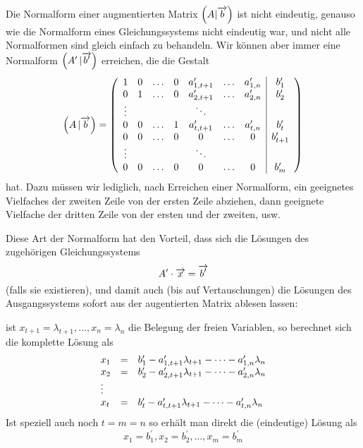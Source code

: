 \begin{notiz}\label{gls_einfache_normalform} 
Die Normalform einer augmentierten Matrix $\left(A \vert \overrightarrow{b}\right)$ ist nicht eindeutig, genauso wie die 
Normalform eines Gleichungssystems nicht eindeutig war, und nicht alle Normalformen sind gleich einfach zu 
behandeln. Wir können aber immer eine Normalform $\left(A' \, \vert \overrightarrow{b'}\right)$ erreichen, die 
die Gestalt 
  	$$ \left(A \, \vert \overrightarrow{b}\right) = \left( \begin{array} {c c c c c c c | c}
   	1 & 0 & \ldots & 0 & a^{\prime}_{1,t+1} & \ldots & a^{\prime}_{1,n} & b_1^{\prime} \\
   	0 & 1 & \ldots & 0 & a^{\prime}_{2,t+1} & \ldots & a^{\prime}_{2,n} & b_2^{\prime} \\
   	\vdots & & & & \ddots & & & \\
   	0 & 0 & \ldots & 1 & a^{\prime}_{t, t+1} & \ldots & a^{\prime}_{t, n} & b_t^{\prime} \\
   	0 & 0 & \ldots & 0 & 0 & \ldots & 0 & b_{t+1}^{\prime} \\
   	\vdots & & & & \ddots & & & \\
   	0 & 0 & \ldots & 0 & 0 & \ldots & 0 & b_m^{\prime} \\ \end{array} \right) $$
hat. Dazu müssen wir lediglich, nach Erreichen einer Normalform, ein geeignetes Vielfaches der zweiten Zeile 
von der ersten Zeile abziehen, dann geeignete Vielfache der dritten Zeile von der ersten und der zweiten, usw.

Diese Art der Normalform hat den Vorteil, dass sich die Lösungen des zugehörigen Gleichungssystems
  	$$ A^{\prime} \cdot \overrightarrow{x} = \overrightarrow{b^{\prime}} $$
(falls sie existieren), und damit auch (bis auf Vertauschungen) die Lösungen des Ausgangssystems sofort 
aus der augentierten Matrix ablesen lassen:

ist $x_{t+1} = \lambda_{t+1}, \ldots, x_n = \lambda_n$ die Belegung der freien Variablen, so berechnet sich 
die komplette Lösung als
  	$$ \begin{array} {l c l}
   	x_1 & = & b^{\prime}_1 - a^{\prime}_{1,t+1} \lambda_{t+1} - \cdots - a^{\prime}_{1,n} \lambda_n \\
   	x_2 & = & b^{\prime}_2 - a^{\prime}_{2,t+1} \lambda_{t+1} - \cdots - a^{\prime}_{2,n} \lambda_n \\
   	\vdots & & \\
   	x_t & = & b^{\prime}_t - a^{\prime}_{t,t+1} \lambda_{t+1} - \cdots - a^{\prime}_{t,n} \lambda_n 
  	\end{array} $$ 
Ist speziell auch noch $t = m = n$ so erhält man direkt die (eindeutige) Lösung als
  	$$ x_1 = b^{\prime}_1, x_2 = b^{\prime}_2, \ldots , x_m = b^{\prime}_m $$
\end{notiz}

